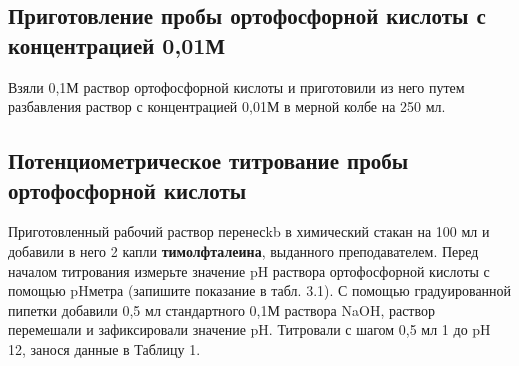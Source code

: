 \documentclass[a4paper,12pt]{article}
\begin{document}
\subsection{Приготовление пробы ортофосфорной кислоты с концентрацией 0,01М}
Взяли 0,1М раствор ортофосфорной кислоты  и приготовили из него путем разбавления раствор с концентрацией 0,01М в
мерной колбе на 250 мл.
\subsection{Потенциометрическое титрование пробы ортофосфорной кислоты}
Приготовленный рабочий раствор перенесkb в химический стакан на 100 мл и
добавили в него 2 капли \textbf{тимолфталеина}, выданного преподавателем. Перед началом
титрования измерьте значение pH раствора ортофосфорной кислоты с помощью pHметра (запишите показание в табл. 3.1). С помощью градуированной пипетки добавили
0,5 мл стандартного 0,1М раствора NaOH, раствор перемешали и зафиксировали
значение pH. Титровали с шагом 0,5 мл
1
до pH 12, занося данные в Таблицу 1.
\end{document}
